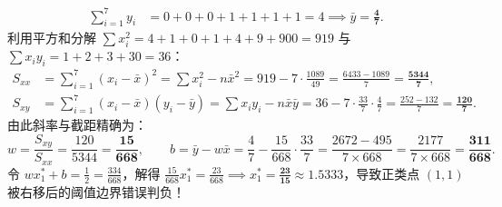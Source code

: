 \begin{enumerate}[label=(\alph*), leftmargin=1.8em]
\begin{align*}
    \sum_{i=1}^7 y_i &= 0 + 0 + 0 + 1 + 1 + 1 + 1 = 4 \implies \bar{y} = \mathbf{\frac{4}{7}}.
  \end{align*}
  利用平方和分解 $\sum x_i^2 = 4 + 1 + 0 + 1 + 4 + 9 + 900 = 919$ 与 $\sum x_i y_i = 1 + 2 + 3 + 30 = 36$：
  \begin{align*}
    S_{xx} &= \sum_{i=1}^7 (x_i - \bar{x})^2 = \sum x_i^2 - n\bar{x}^2
            = 919 - 7\cdot\frac{1089}{49} = \frac{6433 - 1089}{7} = \mathbf{\frac{5344}{7}}, \\
    S_{xy} &= \sum_{i=1}^7 (x_i - \bar{x})(y_i - \bar{y}) = \sum x_i y_i - n\bar{x}\bar{y}
            = 36 - 7\cdot\frac{33}{7}\cdot\frac{4}{7} = \frac{252 - 132}{7} = \mathbf{\frac{120}{7}}.
  \end{align*}
  由此斜率与截距精确为：
  \[
    w = \frac{S_{xy}}{S_{xx}} = \frac{120}{5344} = \mathbf{\frac{15}{668}}, \qquad
    b = \bar{y} - w\bar{x} = \frac{4}{7} - \frac{15}{668}\cdot\frac{33}{7}
      = \frac{2672 - 495}{7\times 668} = \frac{2177}{7\times 668} = \mathbf{\frac{311}{668}}.
  \]
  令 $w x_1^* + b = \frac{1}{2} = \frac{334}{668}$，解得 $\frac{15}{668}x_1^* = \frac{23}{668} \implies x_1^* = \mathbf{\frac{23}{15} \approx 1.5333}$，导致正类点 $(1, 1)$ 被右移后的阈值边界错误判负！
\end{enumerate}

